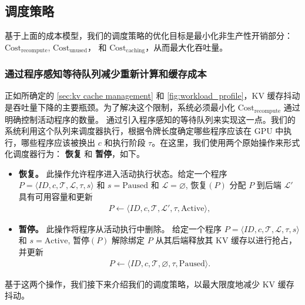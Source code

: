 \subsection{调度策略}
\label{sec:scheduling_policy}
基于上面的成本模型，我们的调度策略的优化目标是最小化非生产性开销部分： $\text{Cost}_{\text{recompute}}$, $\text{Cost}_{\text{unused}}$， 和 $\text{Cost}_{\text{caching}}$，从而最大化吞吐量。

\subsubsection{通过程序感知等待队列减少重新计算和缓存成本}
\label{sec:4.3.1}
正如所确定的 \autoref{sec:kv cache management} 和 \autoref{fig:workload_profile}，KV 缓存抖动是吞吐量下降的主要瓶颈。为了解决这个限制，系统必须最小化 $\text{Cost}_{\text{recompute}}$ 通过明确控制活动程序的数量。 \ouralg 通过引入程序感知的等待队列来实现这一点。我们的系统利用这个队列来调度器执行，根据令牌长度确定哪些程序应该在 GPU 中执行，哪些程序应该被换出 $c$ 和执行阶段 $\tau$。在这里，我们使用两个原始操作来形式化调度器行为： \textbf{恢复} 和 \textbf{暂停}，如下。

\begin{itemize}[itemsep=0.0pt,topsep=0pt,leftmargin=*]
    \item \textbf{恢复。} 此操作允许程序进入活动执行状态。给定一个程序 $P = \langle \mathit{ID}, c, \mathcal{T}, \mathcal{L}, \tau, s \rangle$ 和 $s = \text{Paused}$ 和 $\mathcal{L} = \varnothing$,
  恢复$(P)$ 分配 $P$ 到后端 $\mathcal{L}'$ 具有可用容量和更新
  \begin{align}
  P \leftarrow \langle \mathit{ID}, c, \mathcal{T}, \mathcal{L}', \tau, \text{Active} \rangle,
  \end{align}
    \item \textbf{暂停。} 此操作将程序从活动执行中删除。
给定一个程序 $P = \langle \mathit{ID}, c, \mathcal{T}, \mathcal{L}, \tau, s \rangle$
和 $s = \text{Active}$,
暂停$(P)$ 解除绑定 $P$ 从其后端释放其 KV 缓存以进行抢占，并更新
\begin{align}
P \leftarrow \langle \mathit{ID}, c, \mathcal{T}, \varnothing, \tau, \text{Paused} \rangle .
\end{align}
\end{itemize}

\noindent 基于这两个操作，我们接下来介绍我们的调度策略，以最大限度地减少 KV 缓存抖动。

